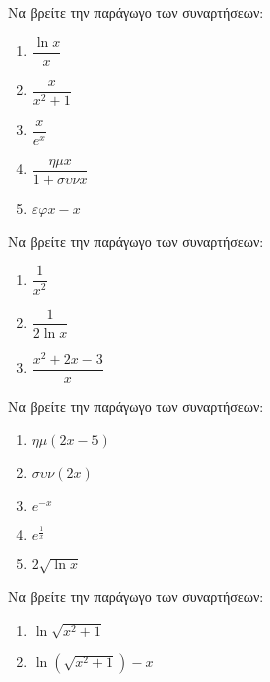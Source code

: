 \documentclass{presentation}
\begin{document}
\begin{askisi}
    Να βρείτε την παράγωγο των συναρτήσεων:
    \begin{enumerate}
        \item<1-> $\dfrac{\ln x}{x}$
        \item<2-> $\dfrac{x}{x^2+1}$
        \item<3-> $\dfrac{x}{e^x}$
        \item<4-> $\dfrac{ημx}{1+συνx}$
        \item<5-> $εφx-x$
    \end{enumerate}

\end{askisi}

\begin{askisi}
    Να βρείτε την παράγωγο των συναρτήσεων:
    \begin{enumerate}
        \item<1-> $\dfrac{1}{x^2}$
        \item<2-> $\dfrac{1}{2\ln x}$
        \item<3-> $\dfrac{x^2+2x-3}{x}$
    \end{enumerate}

\end{askisi}

\begin{askisi}
    Να βρείτε την παράγωγο των συναρτήσεων:
    \begin{enumerate}
        \item<1-> $ημ(2x-5)$
        \item<2-> $συν(2x)$
        \item<3-> $e^{-x}$
        \item<4-> $e^{\frac{1}{x}}$
        \item<5-> $2\sqrt{\ln x}$
    \end{enumerate}

\end{askisi}

\begin{askisi}
    Να βρείτε την παράγωγο των συναρτήσεων:
    \begin{enumerate}
        \item<1-> $\ln \sqrt{x^2+1}$
        \item<2-> $\ln(\sqrt{x^2+1})-x$
    \end{enumerate}

\end{askisi}
\end{document}
